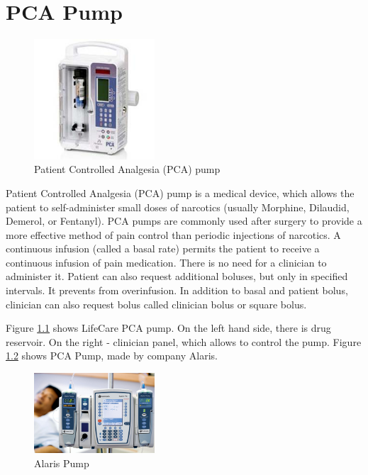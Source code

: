 
\cleardoublepage


\chapter{PCA Pump}
\label{pcapump}


\begin{figure}
  \begin{center}
    \includegraphics[width=0.4\textwidth]{figures/pca-pump.png}
  \end{center}
  \caption{Patient Controlled Analgesia (PCA) pump}
  \label{figure:pca-pump}
\end{figure}

Patient Controlled Analgesia (PCA) pump is a medical device, which allows the patient to self-administer small doses of narcotics (usually Morphine, Dilaudid, Demerol, or Fentanyl). PCA pumps are commonly used after surgery to provide a more effective method of pain control than periodic injections of narcotics. A continuous infusion (called a basal rate) permits the patient to receive a continuous infusion of pain medication. There is no need for a clinician to administer it. Patient can also request additional boluses, but only in specified intervals. It prevents from overinfusion. In addition to basal and patient bolus, clinician can also request bolus called clinician bolus or square bolus. 

Figure \ref{figure:pca-pump} shows LifeCare PCA pump. On the left hand side, there is drug reservoir. On the right -  clinician panel, which allows to control the pump. Figure \ref{figure:alaris-pump} shows PCA Pump, made by company Alaris. 

\begin{figure}
  \begin{center}
    \includegraphics[width=0.4\textwidth]{figures/alaris-pump.png}
  \end{center}
  \caption{Alaris Pump}
  \label{figure:alaris-pump}
\end{figure}

